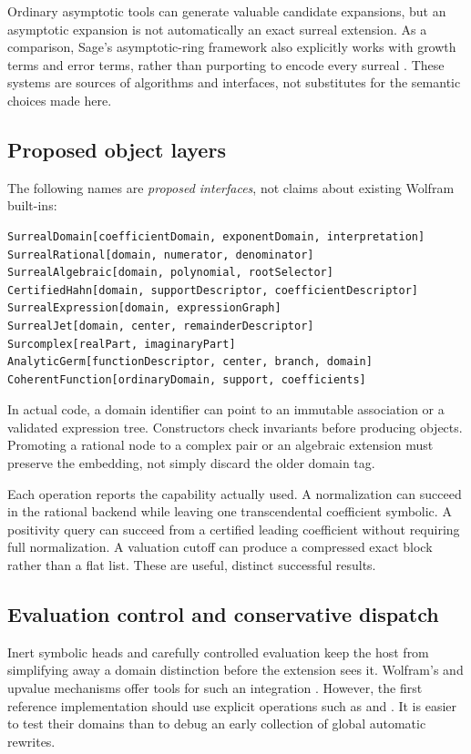 \documentclass[11pt,letterpaper]{article}
\theoremstyle{definition}
\newcommand{\code}[1]{\texttt{\detokenize{#1}}}
\numberwithin{equation}{section}
\begin{document}
Ordinary asymptotic tools can generate valuable candidate expansions, but an asymptotic expansion is not automatically an exact surreal extension. As a comparison, Sage's asymptotic-ring framework also explicitly works with growth terms and error terms, rather than purporting to encode every surreal \cite{SageAsymptotic}. These systems are sources of algorithms and interfaces, not substitutes for the semantic choices made here.

\subsection{Proposed object layers}
The following names are \emph{proposed interfaces}, not claims about existing Wolfram built-ins:
\begin{lstlisting}
SurrealDomain[coefficientDomain, exponentDomain, interpretation]
SurrealRational[domain, numerator, denominator]
SurrealAlgebraic[domain, polynomial, rootSelector]
CertifiedHahn[domain, supportDescriptor, coefficientDescriptor]
SurrealExpression[domain, expressionGraph]
SurrealJet[domain, center, remainderDescriptor]
Surcomplex[realPart, imaginaryPart]
AnalyticGerm[functionDescriptor, center, branch, domain]
CoherentFunction[ordinaryDomain, support, coefficients]
\end{lstlisting}
In actual code, a domain identifier can point to an immutable association or a validated expression tree. Constructors check invariants before producing objects. Promoting a rational node to a complex pair or an algebraic extension must preserve the embedding, not simply discard the older domain tag.

Each operation reports the capability actually used. A normalization can succeed in the rational backend while leaving one transcendental coefficient symbolic. A positivity query can succeed from a certified leading coefficient without requiring full normalization. A valuation cutoff can produce a compressed exact block rather than a flat list. These are useful, distinct successful results.

\subsection{Evaluation control and conservative dispatch}
Inert symbolic heads and carefully controlled evaluation keep the host from simplifying away a domain distinction before the extension sees it. Wolfram's \code{Inactive} and upvalue mechanisms offer tools for such an integration \cite{WLInactive,WLUpValues}. However, the first reference implementation should use explicit operations such as \code{SRAdd} and \code{SRSin}. It is easier to test their domains than to debug an early collection of global automatic rewrites.
\end{document}
